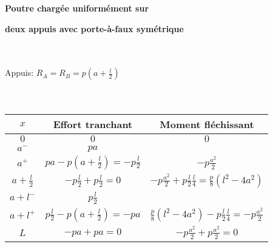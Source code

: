 \documentclass[a4paper]{article}
\begin{document}
\begin{minipage}{9cm}
\centerline{\textbf{Poutre chargée uniformément sur}}
\centerline{\textbf{deux appuis avec porte-à-faux symétrique}}
~\\
~\\
Appuis: $R_A = R_B = p(a + \frac{l}{2})$\\
~\\
~\\
\small
\begin{tabular}{|c|c|c|}\hline
$x$&
Effort tranchant&
Moment fléchissant\\
\hline
$0$&
$0$&
$0$\\
\hline
$a^-$&
$pa$&
\\
\hline
$a^+$&
$pa - p(a+\frac{l}{2}) = -p\frac{l}{2}$&
$-p\frac{a^2}{2}$\\
\hline
$a+\frac{l}{2}$&
$-p\frac{l}{2} + p\frac{l}{2} = 0$&
$-p\frac{a^2}{2} + p\frac{l}{2}\frac{l}{4} = \frac{p}{8}(l^2 - 4a^2)$\\
\hline
$a+l^-$&
$p\frac{l}{2}$&
\\
\hline
$a+l^+$&
$p\frac{l}{2} - p(a+\frac{l}{2}) = -pa$&
$\frac{p}{8}(l^2 - 4a^2) - p\frac{l}{2}\frac{l}{4} = -p\frac{a^2}{2}$\\
\hline
$L$&
$-pa + pa = 0$&
$-p\frac{a^2}{2} + p\frac{a^2}{2} = 0$\\
\hline
\end{tabular}
\normalsize
\end{minipage}
\end{document}
